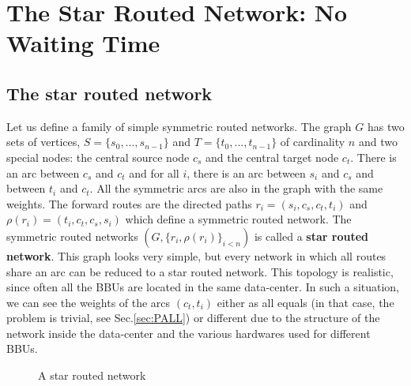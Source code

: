 \documentclass[10pt, conference, letterpaper]{IEEEtran}
\begin{document}
\section{The Star Routed Network: No Waiting Time} \label{sec:PAZL}
  
   
    
    \subsection{The star routed network}
    
      Let us define a family of simple symmetric routed networks. 
      The graph $G$ has two sets of vertices, $S=\{s_0,...,s_{n-1}\}$ and $T=\{t_0,...,t_{n-1}\}$ of cardinality $n$ and two special nodes:
      the central source node {\bf $c_s$} and the central target node {\bf $c_t$}.
      There is an arc between {\bf $c_s$} and {\bf $c_t$} and for all $i$, there is an arc between $s_i$ and $c_s$ and between $t_i$ and $c_t$.
      All the symmetric arcs are also in the graph with the same weights.
      The forward routes are the directed paths $r_i = (s_i,c_s,c_t,t_i)$ and $\rho(r_i) = (t_i,c_t,c_s,s_i)$ which define a symmetric routed network. 
      The symmetric routed networks $(G, \{r_i,\rho(r_i)\}_{i<n})$ is called a \textbf{star routed network}. This graph looks very simple, but every network in which all routes share an arc can be reduced to a star routed network. This topology is realistic, since often all the BBUs are located in the same data-center. In such a situation, we can see the weights of the arcs $(c_t,t_i)$ either as all equals (in that case, the problem is trivial, see Sec.\ref{sec:PALL}) or different due to the structure of the network inside the data-center and the various hardwares used for different BBUs. 
      \begin{figure}
       \begin{center}

  \end{center}
  \caption{A star routed network}
  \end{figure}
	
\end{document}
